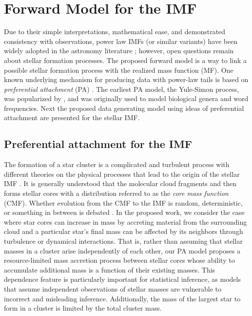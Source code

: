 \documentclass[12pt]{article}
\begin{document}
\section{Forward Model for the IMF}
\label{PAmodelSection}
Due to their simple interpretations, mathematical ease, and demonstrated consistency with observations, power law IMFs (or similar variants) have been widely adopted in the astronomy literature \citep{kroupa2012}; however, open questions remain about stellar formation processes.  The proposed forward model is a way to link a possible stellar formation process with the realized mass function (MF).  One known underlying mechanism for producing data with power-law tails is based on {\em preferential attachment} (PA) \citep{Mitzenmacher2004}.  
The earliest PA model, the Yule-Simon process, was popularized by \cite{simon55}, and was originally used to model biological genera and word frequencies.  Next the proposed data generating model using ideas of preferential attachment are presented for the stellar IMF.


\subsection{Preferential attachment for the IMF} \label{sec:pa}
The formation of a star cluster is a complicated and turbulent process with different theories on the physical processes that lead to the origin of the stellar IMF \citep{chabrier2005, Bate2012, OffnerEtAl2014, Pokhrel:2018nr}.  It is generally understood that the molecular cloud fragments and then forms stellar cores with a distribution referred to as the \emph{core mass function} (CMF).  Whether evolution from the CMF to the IMF is random, deterministic, or something in between is debated \citep{OffnerEtAl2014}.  In the proposed work, we consider the case where star cores can increase in mass by accreting material from the surrounding cloud and a particular star's final mass can be affected by its neighbors through turbulence or dynamical interactions.
%
That is, rather than assuming that stellar masses in a cluster arise independently of each other, our PA model proposes a resource-limited mass accretion process between stellar cores whose ability to accumulate additional mass is a function of their existing masses. 
This dependence feature is particularly important for statistical inference, as models that assume independent observations of stellar masses are vulnerable to incorrect and misleading inference. 
Additionally, the mass of the largest star to form in a cluster is limited by the total cluster mass.
\end{document}

